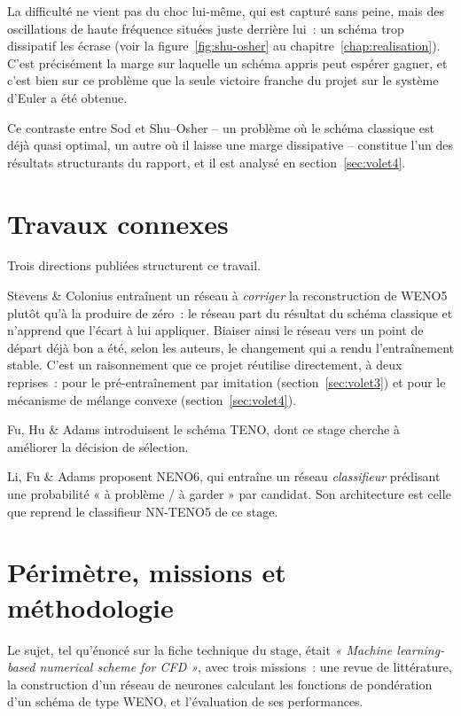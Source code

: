 \documentclass[12pt,a4paper,oneside]{report}
\begin{document}
La difficulté ne vient pas du choc lui-même, qui est capturé sans peine, mais
des oscillations de haute fréquence situées juste derrière lui~: un schéma
trop dissipatif les écrase (voir la figure~\ref{fig:shu-osher} au
chapitre~\ref{chap:realisation}). C'est précisément la marge sur laquelle un
schéma appris peut espérer gagner, et c'est bien sur ce problème que la seule
victoire franche du projet sur le système d'Euler a été obtenue.

Ce contraste entre Sod et Shu--Osher -- un problème où le schéma classique est
déjà quasi optimal, un autre où il laisse une marge dissipative -- constitue
l'un des résultats structurants du rapport, et il est analysé en
section~\ref{sec:volet4}.

\section{Travaux connexes}

Trois directions publiées structurent ce travail.

Stevens \& Colonius \cite{stevens2020} entraînent un réseau à \emph{corriger}
la reconstruction de WENO5 plutôt qu'à la produire de zéro~: le réseau part du
résultat du schéma classique et n'apprend que l'écart à lui appliquer.
Biaiser ainsi le réseau vers un point de départ déjà bon a été, selon les
auteurs, le changement qui a rendu l'entraînement stable. C'est un
raisonnement que ce projet réutilise directement, à deux reprises~: pour le
pré-entraînement par imitation (section~\ref{sec:volet3}) et pour le mécanisme
de mélange convexe (section~\ref{sec:volet4}).

Fu, Hu \& Adams \cite{fu2016} introduisent le schéma TENO, dont ce stage
cherche à améliorer la décision de sélection.

Li, Fu \& Adams \cite{li2022} proposent NENO6, qui entraîne un réseau
\emph{classifieur} prédisant une probabilité « à problème / à garder » par
candidat. Son architecture est celle que reprend le classifieur NN-TENO5 de ce
stage.

\section{Périmètre, missions et méthodologie}

Le sujet, tel qu'énoncé sur la fiche technique du stage, était \emph{« Machine
learning-based numerical scheme for CFD »}, avec trois missions~: une revue de
littérature, la construction d'un réseau de neurones calculant les fonctions de
pondération d'un schéma de type WENO, et l'évaluation de ses performances.
\end{document}
